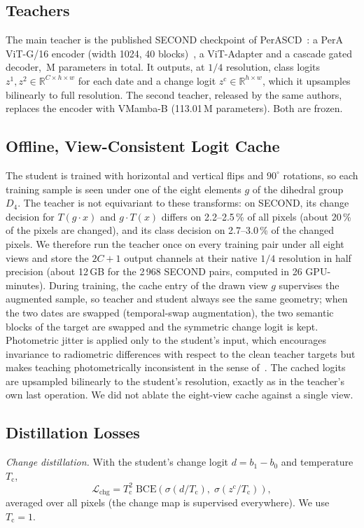 \documentclass[journal]{IEEEtran}
\begin{document}
\subsection{Teachers}
\label{sec:teacher-arch}
The main teacher is the published SECOND checkpoint of PerASCD~\cite{shen2026foundation}: a
PerA ViT-G/16 encoder (width 1024, 40 blocks)~\cite{shen2026contrastive}, a ViT-Adapter
\cite{chen2023vision} and a cascade gated decoder, \TeacherParams\,M parameters in total. It
outputs, at $1/4$ resolution, class logits $z^{1},z^{2}\in\mathbb{R}^{C\times h\times w}$ for
each date and a change logit $z^{\mathrm{c}}\in\mathbb{R}^{h\times w}$, which it upsamples
bilinearly to full resolution. The second teacher, released by the same authors, replaces the
encoder with VMamba-B (\num{113.01}\,M parameters). Both are frozen.

\subsection{Offline, View-Consistent Logit Cache}
\label{sec:cache}
The student is trained with horizontal and vertical flips and $90^\circ$ rotations, so each
training sample is seen under one of the eight elements $g$ of the dihedral group $D_4$. The
teacher is not equivariant to these transforms: on SECOND, its change decision for
$T(g\cdot x)$ and $g\cdot T(x)$ differs on 2.2--2.5\,\% of all pixels (about 20\,\% of the pixels are changed), and its class
decision on 2.7--3.0\,\% of the changed pixels. We
therefore run the teacher once on every training pair under all eight views and store the
$2C+1$ output channels at their native $1/4$ resolution in half precision (about 12\,GB for
the 2\,968 SECOND pairs, computed in 26 GPU-minutes). During training, the cache entry of the
drawn view $g$ supervises the augmented sample, so teacher and student always see the same
geometry; when the two dates are swapped (temporal-swap augmentation), the two semantic
blocks of the target are swapped and the symmetric change logit is kept. Photometric jitter is
applied only to the student's input, which encourages invariance to radiometric differences with
respect to the clean teacher targets but makes teaching photometrically inconsistent in the sense
of~\cite{beyer2022knowledge}. The
cached logits are upsampled bilinearly to the student's resolution, exactly as in the teacher's
own last operation. We did not ablate the eight-view cache against a single view.

\subsection{Distillation Losses}
\label{sec:losses}
\emph{Change distillation.} With the student's change logit $d=b_{1}-b_{0}$ and temperature
$T_{\mathrm{c}}$,
\begin{equation}
\mathcal{L}_{\mathrm{chg}} = T_{\mathrm{c}}^{2}\;\mathrm{BCE}\!\left(\sigma(d/T_{\mathrm{c}}),
\;\sigma(z^{\mathrm{c}}/T_{\mathrm{c}})\right),
\end{equation}
averaged over all pixels (the change map is supervised everywhere). We use
$T_{\mathrm{c}}=1$.
\end{document}
